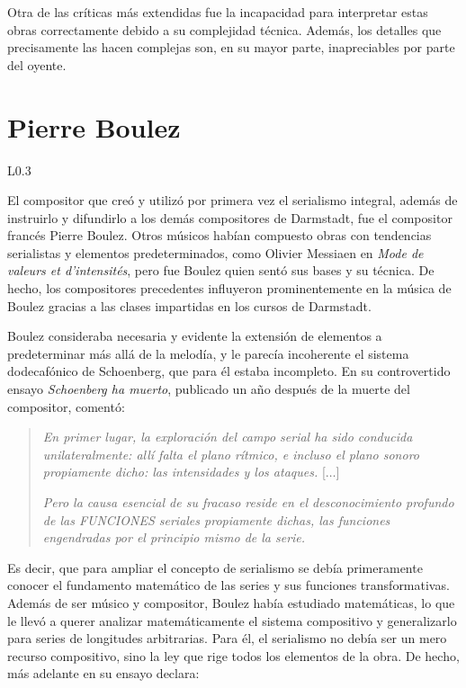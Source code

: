 	Otra de las críticas más extendidas fue la incapacidad para interpretar estas obras correctamente debido a su complejidad técnica. Además, los detalles que precisamente las hacen complejas son, en su mayor parte, inapreciables por parte del oyente.
	
	\pagebreak
	
	\section{Pierre Boulez}
	\label{boulez}
     \begin{wrapfigure}{L}{0.3\textwidth}
		\captionsetup{justification=centering, font=footnotesize}
		\vspace*{-\bigskipamount}
	\end{wrapfigure}
    El compositor que creó y utilizó por primera vez el serialismo integral, además de instruirlo y difundirlo a los demás compositores de Darmstadt, fue el compositor francés Pierre Boulez. Otros músicos habían compuesto obras con tendencias serialistas y elementos predeterminados, como Olivier Messiaen en \emph{Mode de valeurs et d’intensités}, pero fue Boulez quien sentó sus bases y su técnica. De hecho, los compositores precedentes influyeron prominentemente en la música de Boulez gracias a las clases impartidas en los cursos de Darmstadt.
    
    Boulez consideraba necesaria y evidente la extensión de elementos a predeterminar más allá de la melodía, y le parecía incoherente el sistema dodecafónico de Schoenberg, que para él estaba incompleto. En su controvertido ensayo \emph{Schoenberg ha muerto}, publicado un año después de la muerte del compositor, comentó:
    
    \begin{quote}\emph{En primer lugar, la exploración del campo serial ha sido conducida unilateralmente: allí falta el plano rítmico, e incluso el plano sonoro propiamente dicho: las intensidades y los ataques.} [$\ldots$] 
    	
    \emph{Pero la causa esencial de su fracaso reside en el desconocimiento profundo de las FUNCIONES seriales propiamente dichas, las funciones engendradas por el principio mismo de la serie.} \cite{boulez}\end{quote}
    
   Es decir, que para ampliar el concepto de serialismo se debía primeramente conocer el fundamento matemático de las series y sus funciones transformativas. Además de ser músico y compositor, Boulez había estudiado matemáticas, lo que le llevó a querer analizar matemáticamente el sistema compositivo y generalizarlo para series de longitudes arbitrarias. Para él, el serialismo no debía ser un mero recurso compositivo, sino la ley que rige todos los elementos de la obra. De hecho, más adelante en su ensayo declara:
    
